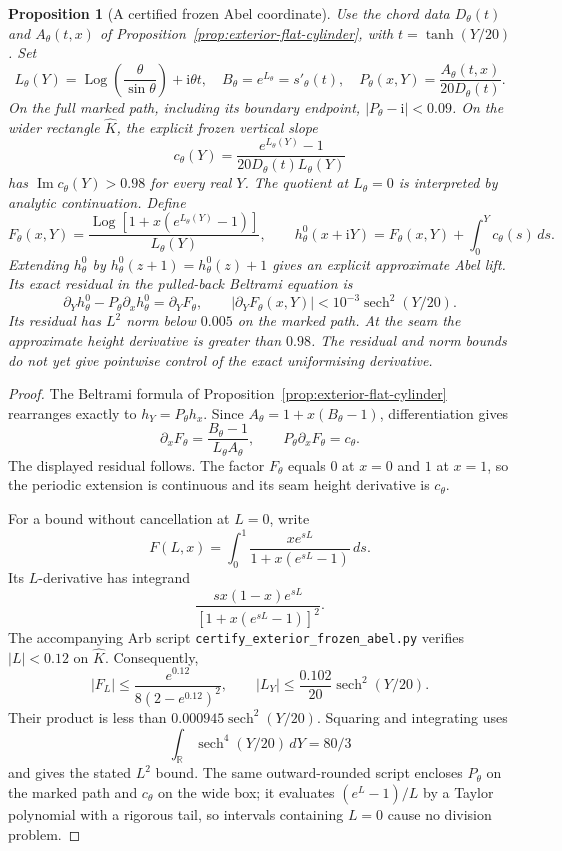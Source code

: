 \documentclass[11pt,a4paper]{article}
\newtheorem{proposition}[theorem]{Proposition}
\theoremstyle{definition}
\newcommand{\ii}{\mathrm{i}}
\begin{document}
\begin{proposition}[A certified frozen Abel coordinate]
\label{prop:exterior-frozen-abel}
Use the chord data $D_\theta(t)$ and $A_\theta(t,x)$ of
Proposition~\ref{prop:exterior-flat-cylinder}, with
$t=\tanh(Y/20)$.  Set
\[
 L_\theta(Y)=
   \operatorname{Log}\!\left(\frac{\theta}{\sin\theta}\right)
       +\ii\theta t,\quad
 B_\theta=e^{L_\theta}=s'_\theta(t),\quad
 P_\theta(x,Y)=\frac{A_\theta(t,x)}{20D_\theta(t)}.
\]
On the full marked path, including its boundary endpoint,
$|P_\theta-\ii|<0.09$.  On the wider rectangle $\widehat K$,
the explicit frozen vertical slope
\[
 c_\theta(Y)=
 \frac{e^{L_\theta(Y)}-1}
      {20D_\theta(t)L_\theta(Y)}
\]
has $\operatorname{Im}c_\theta(Y)>0.98$ for every real $Y$.
The quotient at $L_\theta=0$ is interpreted by analytic
continuation.  Define
\[
 F_\theta(x,Y)=
 \frac{\operatorname{Log}
    [1+x(e^{L_\theta(Y)}-1)]}{L_\theta(Y)},\qquad
 h^0_\theta(x+\ii Y)=F_\theta(x,Y)+\int_0^Yc_\theta(s)\,ds.
\]
Extending $h^0_\theta$ by $h^0_\theta(z+1)=h^0_\theta(z)+1$
gives an explicit approximate Abel lift.  Its exact residual in
the pulled-back Beltrami equation is
\[
 \partial_Yh^0_\theta-P_\theta\partial_xh^0_\theta
       =\partial_YF_\theta,\qquad
 |\partial_YF_\theta(x,Y)|
       <10^{-3}\operatorname{sech}^2(Y/20).
\]
Its residual has $L^2$ norm below $0.005$ on the marked path.
At the seam the approximate height derivative is greater than
$0.98$.
The residual and norm bounds do not yet give pointwise control of
the exact uniformising derivative.
\end{proposition}

\begin{proof}
The Beltrami formula of
Proposition~\ref{prop:exterior-flat-cylinder} rearranges exactly to
$h_Y=P_\theta h_x$.  Since
$A_\theta=1+x(B_\theta-1)$, differentiation gives
\[
 \partial_xF_\theta=
 \frac{B_\theta-1}
      {L_\theta A_\theta},\qquad
 P_\theta\partial_xF_\theta=c_\theta.
\]
The displayed residual follows.  The factor $F_\theta$ equals
$0$ at $x=0$ and $1$ at $x=1$, so the periodic extension is
continuous and its seam height derivative is $c_\theta$.

For a bound without cancellation at $L=0$, write
\[
 F(L,x)=\int_0^1
    \frac{x e^{sL}}{1+x(e^{sL}-1)}\,ds.
\]
Its $L$-derivative has integrand
\[
 \frac{s x(1-x)e^{sL}}{[1+x(e^{sL}-1)]^2}.
\]
The accompanying Arb script
\texttt{certify\_exterior\_frozen\_abel.py} verifies
$|L|<0.12$ on $\widehat K$.  Consequently,
\[
 |F_L|\le
 \frac{e^{0.12}}{8(2-e^{0.12})^2},\qquad
 |L_Y|\le\frac{0.102}{20}\operatorname{sech}^2(Y/20).
\]
Their product is less than
$0.000945\operatorname{sech}^2(Y/20)$.
Squaring and integrating uses
\[
 \int_{\mathbb R}\operatorname{sech}^4(Y/20)\,dY=80/3
\]
and gives the stated $L^2$ bound.
The same outward-rounded script encloses
$P_\theta$ on the marked path and $c_\theta$ on the wide box;
it evaluates $(e^L-1)/L$ by a Taylor polynomial with a rigorous
tail, so intervals containing $L=0$ cause no division problem.
\end{proof}
\end{document}
